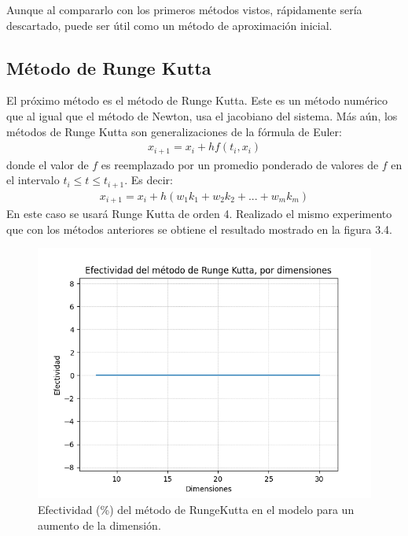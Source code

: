 \par Aunque al compararlo con los primeros m\'etodos vistos, r\'apidamente ser\'ia descartado, puede ser \'util como un m\'etodo de aproximaci\'on inicial.

\subsection{M\'etodo de Runge Kutta}

\par El pr\'oximo m\'etodo es el m\'etodo de Runge Kutta. Este es un m\'etodo num\'erico que al igual que el m\'etodo de Newton, usa el jacobiano del sistema. M\'as a\'un, 
los m\'etodos de Runge Kutta son generalizaciones de la f\'ormula de Euler:
\begin{eqnarray}
x_{i+1}=x_{i}+hf(t_i,x_i)\nonumber
\end{eqnarray}
donde el valor de $f$ es reemplazado por un promedio ponderado de valores de $f$ en el intervalo $t_i\leq t \leq t_{i+1}$. Es decir:
\begin{eqnarray}
x_{i+1}=x_i+h(w_1k_1+w_2k_2+...+w_mk_m)\nonumber
\end{eqnarray}
En este caso se usar\'a Runge Kutta de orden 4. Realizado el mismo experimento que con los m\'etodos anteriores se obtiene el resultado mostrado en la figura 3.4.\\

\begin{figure}[h]
\center
\includegraphics[scale=.4]{Graphics/RungeKutta.png}
\caption{Efectividad (\%) del m\'etodo de RungeKutta en el modelo para un aumento de la dimensi\'on.}
\end{figure}

